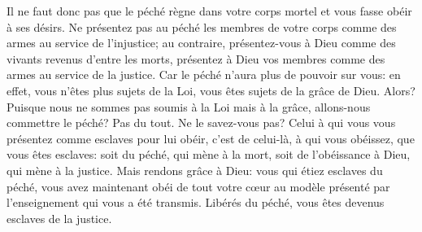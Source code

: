 Il ne faut donc pas que le péché règne dans votre corps mortel
	et vous fasse obéir à ses désirs.
Ne présentez pas au péché les membres de votre corps
		comme des armes au service de l’injustice;
	au contraire, présentez-vous à Dieu
		comme des vivants revenus d’entre les morts,
	présentez à Dieu vos membres comme des armes au service de la justice.
Car le péché n’aura plus de pouvoir sur vous:
	en effet, vous n’êtes plus sujets de la Loi,
	vous êtes sujets de la grâce de Dieu.
Alors? Puisque nous ne sommes pas soumis à la Loi mais à la grâce,
	allons-nous commettre le péché?
	Pas du tout.
Ne le savez-vous pas?
	Celui à qui vous vous présentez comme esclaves pour lui obéir,
	c’est de celui-là, à qui vous obéissez, que vous êtes esclaves:
	soit du péché, qui mène à la mort,
	soit de l’obéissance à Dieu, qui mène à la justice.
Mais rendons grâce à Dieu:
	vous qui étiez esclaves du péché,
	vous avez maintenant obéi de tout votre cœur
		au modèle présenté par l’enseignement qui vous a été transmis.
Libérés du péché, vous êtes devenus esclaves de la justice.
